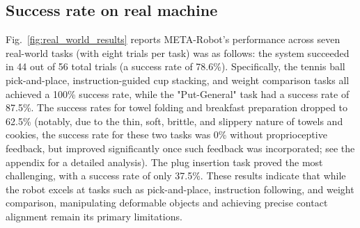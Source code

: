 \documentclass{article} %
\begin{document}
\subsection{Success rate on real machine}

Fig.~\ref{fig:real_world_results} reports META-Robot's performance across seven real-world tasks (with eight trials per task) was as follows: the system succeeded in 44 out of 56 total trials (a success rate of 78.6\%). Specifically, the tennis ball pick-and-place, instruction-guided cup stacking, and weight comparison tasks all achieved a 100\% success rate, while the "Put-General" task had a success rate of 87.5\%. The success rates for towel folding and breakfast preparation dropped to 62.5\% (notably, due to the thin, soft, brittle, and slippery nature of towels and cookies, the success rate for these two tasks was 0\% without proprioceptive feedback, but improved significantly once such feedback was incorporated; see the appendix for a detailed analysis). The plug insertion task proved the most challenging, with a success rate of only 37.5\%. These results indicate that while the robot excels at tasks such as pick-and-place, instruction following, and weight comparison, manipulating deformable objects and achieving precise contact alignment remain its primary limitations. 

\end{document}
